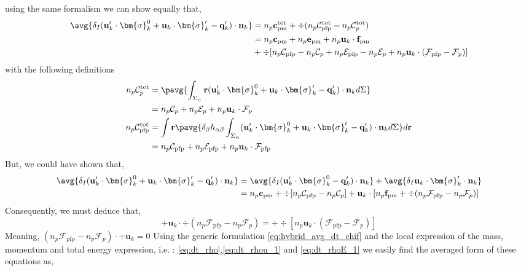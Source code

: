 using the same formalism we can show equally that, 
\begin{align*}
    \avg{\delta_I (\textbf{u}_k' \cdot \bm{\sigma}_k^0 + \textbf{u}_k \cdot \bm{\sigma}_k' - \textbf{q}_k')\cdot \textbf{n}_k}
    &= n_p \textbf{c}_\text{pm}^\text{tot} 
    + \div (n_p \mathcal{C}_\text{pfp}^\text{tot} - n_p \mathcal{C}_p^\text{tot})\\
    &=
    n_p \textbf{c}_\text{pm} 
    + n_p \textbf{e}_\text{pm} 
    + n_p \textbf{u}_k \cdot \textbf{f}_\text{pm}\\
    &+ \div [n_p \mathcal{C}_\text{pfp} - n_p \mathcal{C}_p + n_p \mathcal{E}_\text{pfp} - n_p \mathcal{E}_p + n_p \textbf{u}_k \cdot (\mathcal{F}_\text{pfp} - \mathcal{F}_p) ]
\end{align*}
with the following definitions
\begin{align*}
    n_p \mathcal{C}_p^\text{tot}
    &= \pavg{\int_{\Sigma_\alpha}  \textbf{r} (\textbf{u}_k' \cdot \bm{\sigma}_k^0 + \textbf{u}_k \cdot \bm{\sigma}_k' - \textbf{q}_k')\cdot \textbf{n}_k d\Sigma }\\
    &= n_p \mathcal{C}_p 
    + n_p \mathcal{E}_p 
    + n_p \textbf{u}_k \cdot \mathcal{F}_p 
    \\
    n_p \mathcal{C}_\text{pfp}^\text{tot} 
    &= \int \textbf{r} \pavg{ \delta_\beta  h_{\alpha\beta}\int_{\Sigma_\alpha} (\textbf{u}_k' \cdot \bm{\sigma}_k^0 + \textbf{u}_k \cdot \bm{\sigma}_k' - \textbf{q}_k')\cdot \textbf{n}_k d\Sigma } d\textbf{r} \\
    &= n_p \mathcal{C}_\text{pfp} 
    +n_p \mathcal{E}_\text{pfp} 
    + n_p \textbf{u}_k \cdot \mathcal{F}_\text{pfp} \\
\end{align*} 
But, we could have shown that,
\begin{align*}
    \avg{\delta_I (\textbf{u}_k' \cdot \bm{\sigma}_k^0 + \textbf{u}_k \cdot \bm{\sigma}_k' - \textbf{q}_k')\cdot \textbf{n}_k}
    &= 
    \avg{\delta_I (\textbf{u}_k' \cdot \bm{\sigma}_k^0 - \textbf{q}_k')\cdot \textbf{n}_k}
    + \avg{\delta_I \textbf{u}_k \cdot \bm{\sigma}_k'\cdot \textbf{n}_k}\\
    &=
    n_p \textbf{c}_\text{pm} 
    + \div [n_p \mathcal{C}_\text{pfp} - n_p \mathcal{C}_p]
    + \textbf{u}_k \cdot 
    [n_p \textbf{f}_\text{pm} + \div (n_p \mathcal{F}_\text{pfp} - n_p \mathcal{F}_p)]\\
\end{align*}
Consequently, we must deduce that, 
\begin{equation*}
    + \textbf{u}_k \cdot \div (n_p \mathcal{F}_\text{pfp} - n_p \mathcal{F}_p)
    = 
    + \div [ n_p \textbf{u}_k \cdot (\mathcal{F}_\text{pfp} - \mathcal{F}_p) ]
\end{equation*}
Meaning, $(n_p \mathcal{F}_\text{pfp} - n_p \mathcal{F}_p)\cdot \div \textbf{u}_k = 0$
Using the generic formulation \ref{eq:hybrid_avg_dt_chif} and the local expression of the mass, momentum and total energy expression, i.e. : \ref{eq:dt_rho},\ref{eq:dt_rhou_1} and \ref{eq:dt_rhoE_1} we easily find the averaged form of these equations as, 


